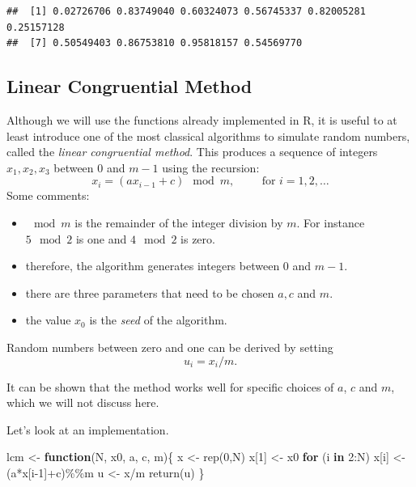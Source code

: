 \documentclass[
]{book}
\newenvironment{Shaded}{\begin{snugshade}}{\end{snugshade}}
\newcommand{\ControlFlowTok}[1]{\textcolor[rgb]{0.13,0.29,0.53}{\textbf{#1}}}
\newcommand{\DecValTok}[1]{\textcolor[rgb]{0.00,0.00,0.81}{#1}}
\newcommand{\FunctionTok}[1]{\textcolor[rgb]{0.00,0.00,0.00}{#1}}
\newcommand{\NormalTok}[1]{#1}
\newcommand{\OtherTok}[1]{\textcolor[rgb]{0.56,0.35,0.01}{#1}}
\newcommand{\SpecialCharTok}[1]{\textcolor[rgb]{0.00,0.00,0.00}{#1}}
\begin{document}
\begin{verbatim}
##  [1] 0.02726706 0.83749040 0.60324073 0.56745337 0.82005281 0.25157128
##  [7] 0.50549403 0.86753810 0.95818157 0.54569770
\end{verbatim}

\hypertarget{linear-congruential-method}{%
\subsection{Linear Congruential Method}\label{linear-congruential-method}}

Although we will use the functions already implemented in R, it is useful to at least introduce one of the most classical algorithms to simulate random numbers, called the \emph{linear congruential method}.
This produces a sequence of integers \(x_1,x_2,x_3\) between 0 and \(m-1\) using the recursion:
\[
x_{i}=(ax_{i-1}+c)\mod m, \hspace{1cm} \mbox{for } i = 1,2,\dots
\]
Some comments:

\begin{itemize}
\item
  \(\mod m\) is the remainder of the integer division by \(m\). For instance \(5 \mod 2\) is one and \(4\mod 2\) is zero.
\item
  therefore, the algorithm generates integers between 0 and \(m-1\).
\item
  there are three parameters that need to be chosen \(a, c\) and \(m\).
\item
  the value \(x_0\) is the \emph{seed} of the algorithm.
\end{itemize}

Random numbers between zero and one can be derived by setting
\[
u_i= x_i/m.
\]

It can be shown that the method works well for specific choices of \(a\), \(c\) and \(m\), which we will not discuss here.

Let's look at an implementation.

\begin{Shaded}
\begin{Highlighting}[]
\NormalTok{lcm }\OtherTok{\textless{}{-}} \ControlFlowTok{function}\NormalTok{(N, x0, a, c, m)\{}
\NormalTok{   x }\OtherTok{\textless{}{-}} \FunctionTok{rep}\NormalTok{(}\DecValTok{0}\NormalTok{,N)}
\NormalTok{   x[}\DecValTok{1}\NormalTok{] }\OtherTok{\textless{}{-}}\NormalTok{ x0}
   \ControlFlowTok{for}\NormalTok{ (i }\ControlFlowTok{in} \DecValTok{2}\SpecialCharTok{:}\NormalTok{N) x[i] }\OtherTok{\textless{}{-}}\NormalTok{ (a}\SpecialCharTok{*}\NormalTok{x[i}\DecValTok{{-}1}\NormalTok{]}\SpecialCharTok{+}\NormalTok{c)}\SpecialCharTok{\%\%}\NormalTok{m}
\NormalTok{   u }\OtherTok{\textless{}{-}}\NormalTok{ x}\SpecialCharTok{/}\NormalTok{m}
   \FunctionTok{return}\NormalTok{(u)}
\NormalTok{\}}
\end{Highlighting}
\end{Shaded}
\end{document}
